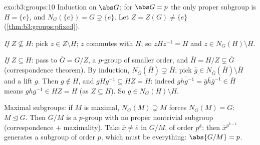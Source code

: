 \begin{solution}{exo:b3:groups:10}
Induction on $\abs G$; for $\abs G = p$ the only proper
subgroup is $H = \{e\}$, and $N_G(\{e\}) = G \supsetneq
\{e\}$. Let $Z = Z(G) \neq \{e\}$ (\cref{thm:b3:groups:pfixed}).

\emph{If $Z \not\subseteq H$}: pick $z \in Z \setminus H$; $z$
commutes with $H$, so $zHz^{-1} = H$ and $z \in N_G(H) \setminus
H$.

\emph{If $Z \subseteq H$}: pass to $\bar G = G/Z$, a $p$-group of
smaller order, and $\bar H = H/Z \subsetneq \bar G$ (correspondence
theorem). By induction, $N_{\bar G}(\bar H) \supsetneq \bar H$;
pick $\bar g \in N_{\bar G}(\bar H) \setminus \bar H$ and a lift
$g$. Then $g \notin H$, and $gHg^{-1} \subseteq HZ = H$: indeed
$\overline{ghg^{-1}} = \bar g \bar h \bar g^{-1} \in \bar H$ means
$ghg^{-1} \in HZ = H$ (as $Z \subseteq H$). So $g \in
N_G(H)\setminus H$.

Maximal subgroups: if $M$ is maximal, $N_G(M) \supsetneq M$
forces $N_G(M) = G$: $M \trianglelefteq G$. Then $G/M$ is a
$p$-group with no proper nontrivial subgroup (correspondence +
maximality). Take $\bar x \neq \bar e$ in $G/M$, of order $p^k$;
then $\bar x^{p^{k-1}}$ generates a subgroup of order $p$, which
must be everything: $\abs{G/M} = p$.
\end{solution}

